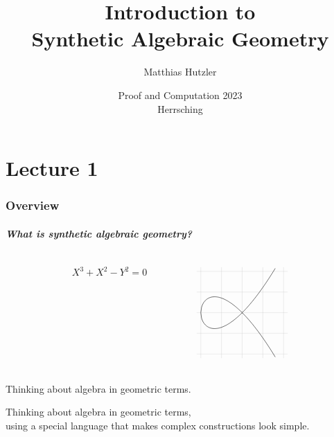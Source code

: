 \documentclass[aspectratio=1610]{beamer}
\author{Matthias Hutzler}
\title[Synthetic Algebraic Geometry]{Introduction to\\Synthetic Algebraic Geometry}
\date{Proof and Computation 2023\\Herrsching}
\begin{document}
\begin{frame}
  \maketitle
\end{frame}

\part{Lecture 1}

\section{Overview}

\begin{frame}
  \frametitle{What is synthetic algebraic geometry?}

  \begin{columns}[c]
    \begin{column}{0.2\textwidth}
    \end{column}
    \begin{column}{0.3\textwidth}
      \[ X^3 + X^2 - Y^2 = 0 \]
    \end{column}
    \begin{column}{0.3\textwidth}
      \[\begin{tikzpicture}[scale=1.5,domain=-1.0:0.8,samples=101]
        \draw[very thin,color=lightgray,step=0.5] (-1.1,-1.1) grid (1.1,1.1);
        \draw plot (\x,{ sqrt(abs(\x*\x + \x*\x*\x))});
        \draw plot (\x,{-sqrt(abs(\x*\x + \x*\x*\x))});
      \end{tikzpicture}\]
    \end{column}
    \begin{column}{0.2\textwidth}
    \end{column}
  \end{columns}

  \bigskip
  \begin{description}
    \item[algebraic geometry]
      Thinking about algebra in geometric terms.
    \item<2->[synthetic algebraic geometry]
      Thinking about algebra in geometric terms,\\
      using a \alert{special language} that makes complex constructions look simple.
  \end{description}

  \bigskip
\end{frame}
\end{document}
